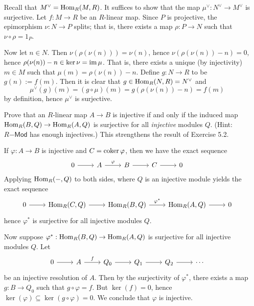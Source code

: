 \documentclass[../../master.tex]{subfiles}
\begin{document}
\begin{solution}
    Recall that $M^{\vee} = \operatorname{Hom}_R(M, R)$.
    It suffices to show that the map $\mu^{\vee}: N^{\vee} \to M^{\vee}$ is surjective.
    Let $f: M \to R$ be an $R$-linear map.
    Since $P$ is projective, the epimorphism $\nu : N \to P$ splits;
    that is, there exists a map $\rho : P \to N$ such that $\nu \circ \rho = 1_P$.

    Now let $n \in N$.
    Then $\nu(\rho(\nu(n))) = \nu(n)$, hence $\nu(\rho(\nu(n)) - n) = 0$, hence $\rho(\nu(n)) - n \in \ker \nu = \operatorname{im} \mu$.
    That is, there exists a unique (by injectivity) $m \in M$ such that $\mu(m) = \rho(\nu(n)) - n$.
    Define $g : N \to R$ to be $g(n) := f(m)$.
    Then it is clear that $g \in \operatorname{Hom}_R(N, R) = N^{\vee}$ and
    \[
    \mu^{\vee}(g)(m) = (g \circ \mu)(m) = g(\rho(\nu(n)) - n) = f(m)
    \]
    by definition, hence $\mu^{\vee}$ is surjective.
\end{solution}

\begin{problem}
    Prove that an $R$-linear map $A \to B$ is injective if and only if the induced map $\operatorname{Hom}_R(B, Q) \to \operatorname{Hom}_R(A, Q)$ is surjective for all \textit{injective} modules $Q$.
    (Hint: $R\mathsf{-Mod}$ has enough injectives.)
    This strengthens the result of Exercise 5.2.
\end{problem}

\begin{solution}
    If $\varphi: A \to B$ is injective and $C = \operatorname{coker} \varphi$, then we have the exact sequence
    \[
    \begin{tikzcd}
        0 & A & B & C & 0
        \arrow[from=1-1, to=1-2]
        \arrow[from=1-2, to=1-3, "\varphi"] 
        \arrow[from=1-3, to=1-4]
        \arrow[from=1-4, to=1-5] 
    \end{tikzcd}
    \]
    Applying $\operatorname{Hom}_R(-, Q)$ to both sides, where $Q$ is an injective module yields the exact sequence
    \[
    \begin{tikzcd}
        0 & \Hom_R(C, Q) & \Hom_R(B, Q) & \Hom_R(A, Q) & 0
        \arrow[from=1-1, to=1-2]
        \arrow[from=1-2, to=1-3] 
        \arrow[from=1-3, to=1-4, "\varphi^{*}"]
        \arrow[from=1-4, to=1-5] 
    \end{tikzcd}
    \]
    hence $\varphi^{*}$ is surjective for all injective modules $Q$.

    Now suppose $\varphi^{*} : \operatorname{Hom}_R(B, Q) \to \operatorname{Hom}_R(A, Q)$ is surjective for all injective modules $Q$.
    Let
    \[
    \begin{tikzcd}
        0 & A & Q_0 & Q_1 & Q_2 & \cdots
        \arrow[from=1-1, to=1-2] 
        \arrow[from=1-2, to=1-3, "f"]
        \arrow[from=1-3, to=1-4] 
        \arrow[from=1-4, to=1-5] 
        \arrow[from=1-5, to=1-6] 
    \end{tikzcd}
    \]
    be an injective resolution of $A$.
    Then by the surjectivity of $\varphi^{*}$, there exists a map $g : B \to Q_0$ such that $g \circ \varphi = f$.
    But $\ker(f) = 0$, hence $\ker(\varphi) \subseteq \ker(g \circ \varphi) = 0$.
    We conclude that $\varphi$ is injective.
\end{solution}
\end{document}
